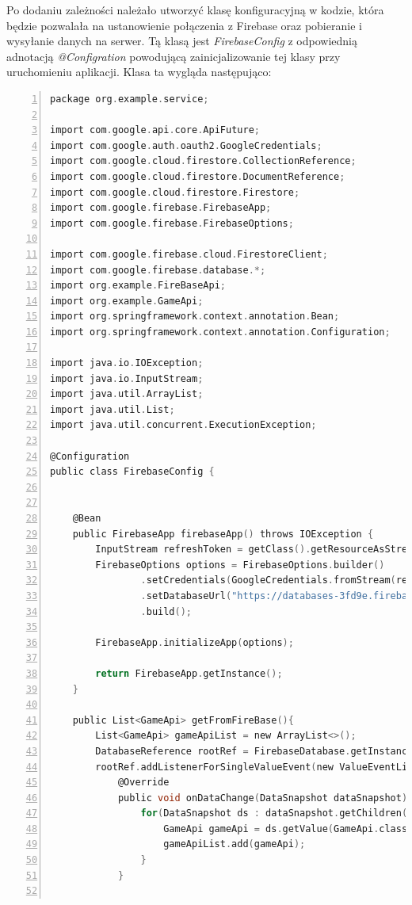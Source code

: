 Po dodaniu zależności należało utworzyć klasę konfiguracyjną w kodzie, która będzie pozwalała na ustanowienie połączenia z Firebase oraz pobieranie i wysyłanie danych na serwer.
Tą klasą jest \textit{FirebaseConfig} z odpowiednią adnotacją \textit{@Configration} powodującą zainicjalizowanie tej klasy przy uruchomieniu aplikacji.
Klasa ta wygląda następująco:
\begin{lstlisting}[language=C, mathescape, frame=single, numbers=left, xleftmargin=2em, framexleftmargin=2em, basicstyle=\ttfamily\bfseries, caption={Klasa do konfiguracji połączenia z Firebase}, label={Klasa do konfiguracji połączenia z Firebase}]
package org.example.service;

import com.google.api.core.ApiFuture;
import com.google.auth.oauth2.GoogleCredentials;
import com.google.cloud.firestore.CollectionReference;
import com.google.cloud.firestore.DocumentReference;
import com.google.cloud.firestore.Firestore;
import com.google.firebase.FirebaseApp;
import com.google.firebase.FirebaseOptions;

import com.google.firebase.cloud.FirestoreClient;
import com.google.firebase.database.*;
import org.example.FireBaseApi;
import org.example.GameApi;
import org.springframework.context.annotation.Bean;
import org.springframework.context.annotation.Configuration;

import java.io.IOException;
import java.io.InputStream;
import java.util.ArrayList;
import java.util.List;
import java.util.concurrent.ExecutionException;

@Configuration
public class FirebaseConfig {


    @Bean
    public FirebaseApp firebaseApp() throws IOException {
        InputStream refreshToken = getClass().getResourceAsStream("/key.json");
        FirebaseOptions options = FirebaseOptions.builder()
                .setCredentials(GoogleCredentials.fromStream(refreshToken))
                .setDatabaseUrl("https://databases-3fd9e.firebaseio.com/")
                .build();

        FirebaseApp.initializeApp(options);

        return FirebaseApp.getInstance();
    }

    public List<GameApi> getFromFireBase(){
        List<GameApi> gameApiList = new ArrayList<>();
        DatabaseReference rootRef = FirebaseDatabase.getInstance().getReference();
        rootRef.addListenerForSingleValueEvent(new ValueEventListener() {
            @Override
            public void onDataChange(DataSnapshot dataSnapshot) {
                for(DataSnapshot ds : dataSnapshot.getChildren()) {
                    GameApi gameApi = ds.getValue(GameApi.class);
                    gameApiList.add(gameApi);
                }
            }


\end{lstlisting}
